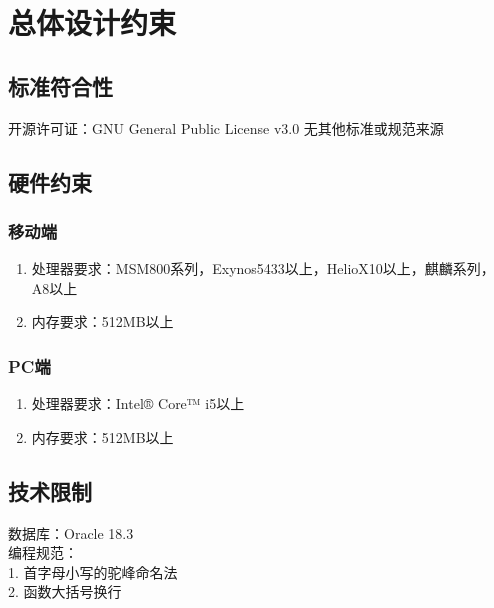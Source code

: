 \chapter{总体设计约束}
\section{标准符合性}
开源许可证：GNU General Public License v3.0
无其他标准或规范来源
\section{硬件约束}
\subsection{移动端}
	\begin{enumerate}
		\item 处理器要求：MSM800系列，Exynos5433以上，HelioX10以上，麒麟系列，A8以上
		\item 内存要求：512MB以上
	\end{enumerate}
\subsection{PC端}
	\begin{enumerate}
		\item 处理器要求：Intel® Core™ i5以上
		\item 内存要求：512MB以上 
	\end{enumerate}
\section{技术限制}
\noindent
数据库：Oracle 18.3 \\
编程规范：\\
    1. 首字母小写的驼峰命名法\\
    2. 函数大括号换行\\